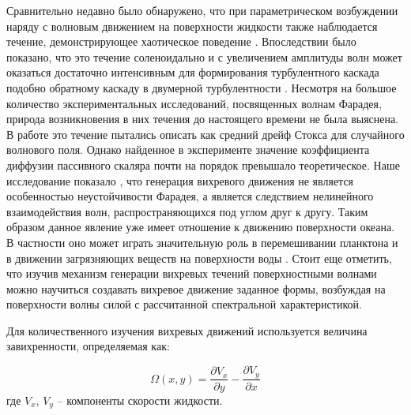Сравнительно недавно было обнаружено, что при параметрическом возбуждении  наряду с волновым движением на поверхности жидкости также наблюдается течение, демонстрирующее хаотическое поведение \cite{Ramshankar1990}. Впоследствии было показано, что это течение соленоидально и с увеличением амплитуды волн может оказаться достаточно интенсивным для формирования турбулентного каскада \cite{VonKameke2011, Francois2014, Francois2013} подобно обратному каскаду в двумерной турбулентности \cite{Kraichnan1967}. Несмотря на большое количество экспериментальных исследований, посвященных волнам Фарадея, природа возникновения в них течения до настоящего времени не была выяснена. В работе \cite{Mesquita1992} это течение пытались описать как средний дрейф Стокса \cite{Stokes1847} для случайного волнового поля. Однако найденное в эксперименте значение коэффициента диффузии пассивного скаляра почти на порядок превышало теоретическое.	
	Наше исследование показало \cite{F5}, что генерация вихревого движения не является особенностью неустойчивости Фарадея, а является следствием нелинейного взаимодействия волн, распространяющихся под углом друг к другу. Таким образом данное явление уже имеет отношение к движению поверхности океана. В частности оно может играть значительную роль в перемешивании планктона и в движении загрязняющих веществ на поверхности воды \cite{Falkovich2009}.
	Стоит еще отметить, что изучив механизм генерации вихревых течений поверхностными волнами можно научиться создавать вихревое движение заданное формы, возбуждая на поверхности волны силой с  рассчитанной спектральной характеристикой.
	
Для количественного изучения вихревых движений используется величина завихренности, определяемая как:

\begin{equation}
 \label{eq:defVort}
\Omega(x, y) = \frac{\partial V_x}{\partial y} - \frac{\partial V_y}{\partial x}
\end{equation}
где $V_x$, $V_y$ – компоненты скорости жидкости. 







